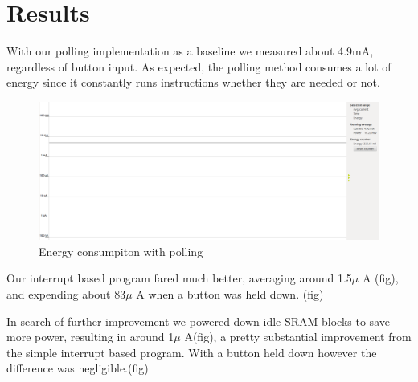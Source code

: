 \chapter{Results}

With our polling implementation as a baseline we measured about 4.9mA, regardless of button input. As expected, the polling method consumes a lot of energy since it constantly runs instructions whether they are needed or not.
\begin{figure}[ht]
 \centering
 \includegraphics[width=\textwidth]{images/performance_with_polling.png}
 \caption{Energy consumpiton with polling}
\end{figure}

Our interrupt based program fared much better, averaging around 1.5$\mu$ A (fig), and expending about 83$\mu$ A when a button was held down. (fig)

In search of further improvement we powered down idle SRAM blocks to save more power, resulting in around 1$\mu$ A(fig), a pretty substantial improvement from the simple interrupt based program. With a button held down however the difference was negligible.(fig)
